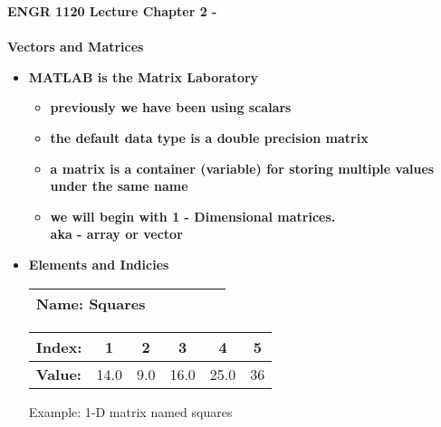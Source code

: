 \documentclass[11pt]{article}
\newcommand{\NUM}{2 }
\newcommand{\B}{\color{blue}}
\newcommand{\GR}{\color{mygreen}}
\newcommand{\PR}{\color{mypurple}}
\begin{document}
\textbf{ \LARGE ENGR 1120 Lecture Chapter \NUM - \\\\ Vectors and Matrices} \\

\begin{itemize}

	\item \textbf{ \LARGE MATLAB is the {\B Matrix Laboratory}}\\
		\Large
		\begin{itemize}
			\item \textbf{previously we have been using {\PR scalars} }  \\ \vspace{30mm}
			\item \textbf{the default data type is a double precision {\GR matrix}} \\ \vspace{30mm}
			\item \textbf{a matrix is a container (variable) for storing multiple values under the same name}  \\ \vspace{30mm}
				
			\item \textbf{we will begin with {\B 1 - Dimensional} matrices.\\aka - {\PR array} or {\GR vector}}\\  \vspace{30mm}
				
		
		\end{itemize}
	\large	
	\item \textbf{ \LARGE Elements and Indicies}\\
		
		\begin{tabular}{|lccccc|} \hline
        \textbf{ Name:}\hspace{2 mm} Squares&&&&&\\ \hline\hline
        \end{tabular}
        
        \begin{tabular}{|lccccc|} \hline
        \textbf{ Index:}\hspace{2 mm}&1&2&3&4&5 \\ \hline
        \textbf{ Value:}\hspace{4 mm}&14.0&9.0&16.0&25.0&36\\ \hline
        \end{tabular}\hspace{5mm} Example: 1-D matrix named {\GR squares}
        \vspace{30 mm} \\
        

\end{itemize}
\end{document}
